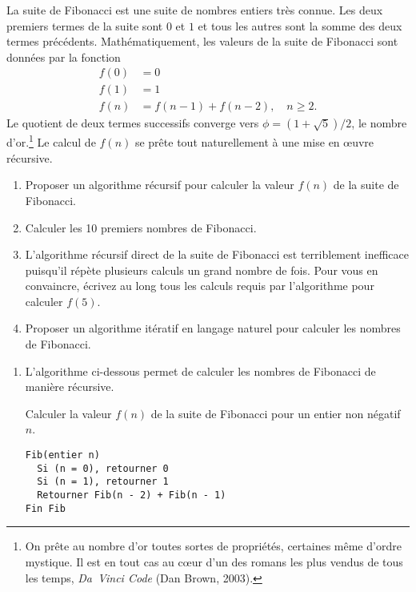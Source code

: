 \begin{exercice}
  La suite de Fibonacci est une suite de
  nombres entiers très connue. Les deux premiers termes de la suite
  sont $0$ et $1$ et tous les autres sont la somme des deux termes
  précédents. Mathématiquement, les valeurs de la suite de Fibonacci
  sont données par la fonction
  \begin{align*}
    f(0) &= 0 \\
    f(1) &= 1 \\
    f(n) & = f(n - 1) + f(n - 2), \quad n \geq 2.
  \end{align*}
  Le quotient de deux termes successifs converge vers
  $\phi = (1 + \sqrt{5})/2$, le nombre d'or.\footnote{%
    On prête au nombre d'or toutes sortes de propriétés, certaines
    même d'ordre mystique. Il est en tout cas au cœur d'un des romans
    les plus vendus de tous les temps, \emph{Da~Vinci Code} (Dan
    Brown, 2003).} %
  Le calcul de $f(n)$ se prête tout naturellement à une mise en œuvre
  récursive.
  \begin{enumerate}
  \item Proposer un algorithme récursif pour calculer la valeur $f(n)$
    de la suite de Fibonacci.
  \item Calculer les 10 premiers nombres de Fibonacci.
  \item L'algorithme récursif direct de la suite de Fibonacci est
    terriblement inefficace puisqu'il répète plusieurs calculs un
    grand nombre de fois. Pour vous en convaincre, écrivez au long
    tous les calculs requis par l'algorithme pour calculer $f(5)$.
  \item Proposer un algorithme itératif en langage naturel pour
    calculer les nombres de Fibonacci.
  \end{enumerate}
  \begin{sol}
    \begin{enumerate}
    \item L'algorithme ci-dessous permet de calculer les nombres de
      Fibonacci de manière récursive.
      \begin{algorithme}
        \label{algo:algorithmes:Fibonacci}
        Calculer la valeur $f(n)$ de la suite de
        Fibonacci pour un entier non négatif $n$.
        \begin{Schunk}
\begin{Verbatim}
Fib(entier n)
  Si (n = 0), retourner 0
  Si (n = 1), retourner 1
  Retourner Fib(n - 2) + Fib(n - 1)
Fin Fib
\end{Verbatim}

\end{Schunk}
\end{algorithme}
\end{enumerate}
\end{sol}
\end{exercice}
